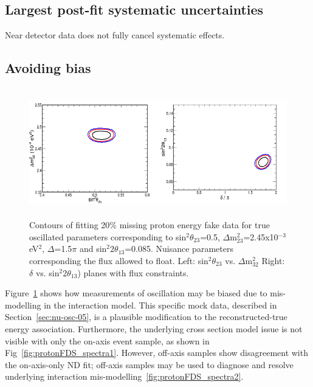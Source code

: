 \subsection{Largest post-fit systematic uncertainties}

Near detector data does not fully cancel systematic effects.

\subsection{Avoiding bias}

\begin{figure}[h]
\centering
\includegraphics[angle=0,width=16cm,height=5.6cm]{graphics/protonEbias_fluxfloated.png}
\caption{Contours of fitting 20\% missing proton energy fake data for true oscillated parameters corresponding to  sin$^{2}\theta_{23}$=0.5, $\Delta$m$^{2}_{23}$=2.45x10$^{-3}$ eV$^{2}$, $\Delta$=1.5$\pi$ and sin$^{2}2\theta_{13}$=0.085. Nuisance parameters corresponding the flux allowed to float.
Left: sin$^{2}\theta_{23}$ vs. $\Delta$m$^{2}_{32}$ Right: $\delta$ vs. sin$^{2}2\theta_{13}$) planes with flux constraints.} \label{protonFDSbias}
\end{figure}

Figure~\ref{protonFDSbias} shows how measurements of oscillation may be biased due to mis-modelling in the interaction model. This specific mock data, described in Section~\ref{sec:nu-osc-05}, is a plausible modification to the reconstructed-true energy association. Furthermore, the underlying cross section model issue is not visible with only the on-axis event sample, as shown in Fig~\ref{fig:protonFDS_spectra1}. However, off-axis samples show disagreement with the on-axis-only ND fit; off-axis samples may be used to diagnose and resolve underlying interaction mis-modelling~\ref{fig:protonFDS_spectra2}. %


